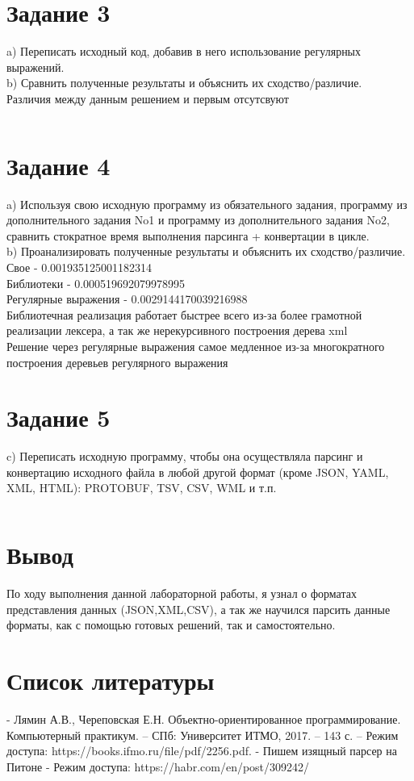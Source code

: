 \documentclass[12pt,onecolumn]{article}
\begin{document}
\section{Задание 3}
a) Переписать исходный код, добавив в него использование регулярных выражений. \\
b) Сравнить полученные результаты и объяснить их сходство/различие. \\
Различия между данным решением и первым отсутсвуют \\
\inputminted{python}{trash/2}
\newpage 
\section{Задание 4}
a) Используя свою исходную программу из обязательного задания, программу из дополнительного задания No1 и программу из дополнительного задания No2, сравнить стократное время выполнения парсинга + конвертации в цикле. \\
b) Проанализировать полученные результаты и объяснить их сходство/различие. \\
Свое - 0.001935125001182314 \\
Библиотеки - 0.000519692079978995 \\
Регулярные выражения - 0.0029144170039216988 \\
Библиотечная реализация работает быстрее всего из-за более грамотной реализации лексера, а так же нерекурсивного построения дерева xml \\
Решение через регулярные выражения самое медленное из-за многократного построения деревьев регулярного выражения
\newpage 
\section{Задание 5}
c) Переписать исходную программу, чтобы она осуществляла парсинг и конвертацию исходного файла в любой другой формат (кроме JSON, YAML, XML, HTML): PROTOBUF, TSV, CSV, WML и т.п. \\
\inputminted{python}{trash/3}
\newpage 
\section{Вывод}
По ходу выполнения данной лабораторной работы, я узнал о форматах представления данных (JSON,XML,CSV), а так же научился парсить данные форматы, как с помощью готовых решений, так и самостоятельно. 
\newpage 
\section{Список литературы}
- Лямин А.В., Череповская Е.Н. Объектно-ориентированное программирование. Компьютерный практикум. – СПб: Университет ИТМО, 2017. – 143 с. – Режим доступа: https://books.ifmo.ru/file/pdf/2256.pdf.
- Пишем изящный парсер на Питоне - Режим доступа: https://habr.com/en/post/309242/
\end{document}
